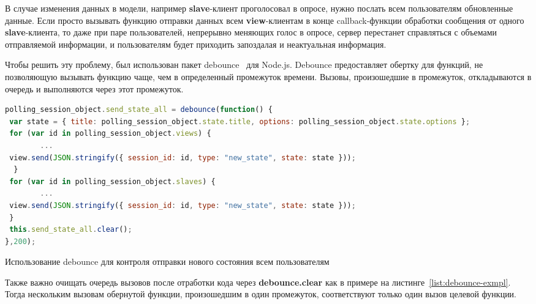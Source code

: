 В случае изменения данных в модели, например \textbf{slave}-клиент проголосовал в опросе, нужно послать всем пользователям обновленные данные. Если просто вызывать функцию отправки данных всем \textbf{view}-клиентам в конце callback-функции обработки сообщения от одного \textbf{slave}-клиента, то даже при паре пользователей, непрерывно меняющих голос в опросе, сервер перестанет справляться с объемами отправляемой информации, и пользователям будет приходить запоздалая и неактуальная информация.

Чтобы решить эту проблему, был использован пакет debounce~\autocite{debounce} для Node.js. Debounce предоставляет обертку для функций, не позволяющую вызывать функцию чаще, чем в определенный промежуток времени. Вызовы, произошедшие в промежуток, откладываются в очередь и выполняются через этот промежуток.
 \begin{ListingEnv}[H]
	\begin{lstlisting}[language=JavaScript]
polling_session_object.send_state_all = debounce(function() {
 var state = { title: polling_session_object.state.title, options: polling_session_object.state.options };
 for (var id in polling_session_object.views) {
		...
 view.send(JSON.stringify({ session_id: id, type: "new_state", state: state }));
  }
 for (var id in polling_session_object.slaves) {
		...
 view.send(JSON.stringify({ session_id: id, type: "new_state", state: state }));
 }
 this.send_state_all.clear();
},200);
\end{lstlisting}
\caption{Использование debounce для контроля отправки нового состояния всем пользователям}
\label{list:debounce-exmpl}
\end{ListingEnv}      

Также важно очищать очередь вызовов после отработки кода через \textbf{debounce.clear} как в примере на листинге~\ref{list:debounce-exmpl}. Тогда нескольким вызовам обернутой функции, произошедшим в один промежуток, соответствуют только один вызов целевой функции.


